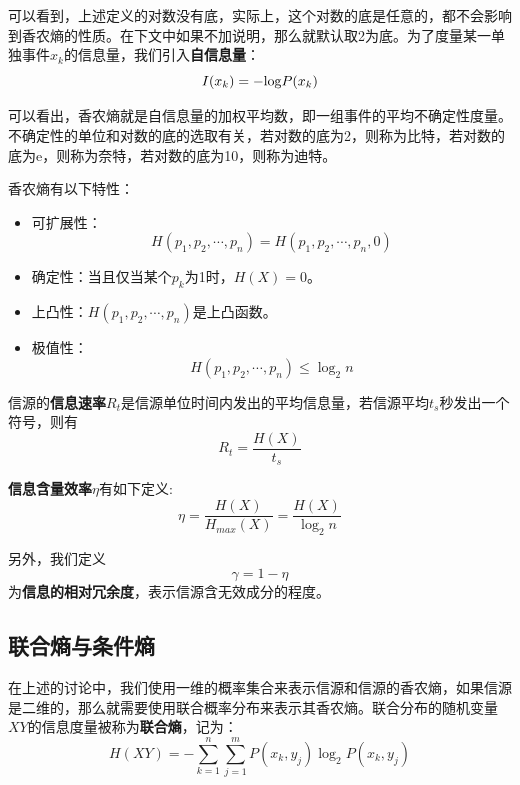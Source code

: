\documentclass[UTF8,a4paper,11pt]{article}
\begin{document}
可以看到，上述定义的对数没有底，实际上，这个对数的底是任意的，都不会影响到香农熵的性质。在下文中如果不加说明，那么就默认取2为底。为了度量某一单独事件$x_k$的信息量，我们引入\textbf{自信息量}：
\begin{equation}
I(x_k)=-{\rm log}P(x_k)
\end{equation}

可以看出，香农熵就是自信息量的加权平均数，即一组事件的平均不确定性度量。不确定性的单位和对数的底的选取有关，若对数的底为2，则称为比特，若对数的底为e，则称为奈特，若对数的底为10，则称为迪特。

香农熵有以下特性：
\begin{itemize}
\item 可扩展性：
\begin{equation}
H(p_1,p_2,\cdots,p_n)=H(p_1,p_2,\cdots,p_n,0)
\end{equation}

\item 确定性：当且仅当某个$p_k$为1时，$H(X)=0$。
\item 上凸性：$H(p_1,p_2,\cdots,p_n)$是上凸函数。
\item 极值性：
\begin{equation}
H(p_1,p_2,\cdots,p_n)\le \log_{2}{n}
\end{equation}
\end{itemize}

信源的\textbf{信息速率}$R_t$是信源单位时间内发出的平均信息量，若信源平均$t_s$秒发出一个符号，则有
\begin{equation}
R_t=\frac{H(X)}{t_s}
\end{equation}

\textbf{信息含量效率}$\eta$有如下定义:
\begin{equation}
\eta=\frac{H(X)}{H_{max}(X)}=\frac{H(X)}{\log_{2}{n}}
\end{equation}

另外，我们定义
\begin{equation}
\gamma=1-\eta
\end{equation}
为\textbf{信息的相对冗余度}，表示信源含无效成分的程度。

\subsection{联合熵与条件熵}
在上述的讨论中，我们使用一维的概率集合来表示信源和信源的香农熵，如果信源是二维的，那么就需要使用联合概率分布来表示其香农熵。联合分布的随机变量$XY$的信息度量被称为\textbf{联合熵}，记为：
\begin{equation}
H(XY)=-\sum_{k=1}^n\sum_{j=1}^mP(x_k,y_j)\log_{2}{P(x_k,y_j)}
\end{equation}
\end{document}
